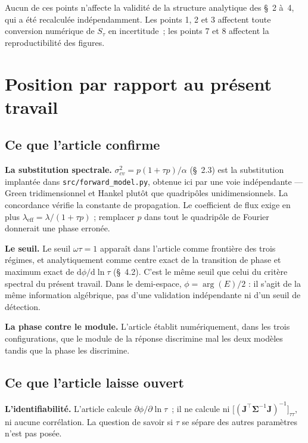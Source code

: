 \documentclass[11pt,a4paper]{article}
\newcommand{\code}[1]{\texttt{\small #1}}
\begin{document}
Aucun de ces points n'affecte la validité de la structure analytique des §~2 à~4, qui a été
recalculée indépendamment. Les points 1, 2 et 3 affectent toute conversion numérique de
$S_\tau$ en incertitude~; les points 7 et 8 affectent la reproductibilité des figures.

\section{Position par rapport au présent travail}

\subsection{Ce que l'article confirme}

\textbf{La substitution spectrale.} $\sigma_{cv}^2 = p(1+\tau p)/\alpha$ (§~2.3) est la
substitution implantée dans \code{src/\allowbreak forward\_model.py}, obtenue ici par une voie
indépendante --- Green tridimensionnel et Hankel plutôt que quadripôles unidimensionnels. La
concordance vérifie la constante de propagation. Le coefficient de flux exige
en plus $\lambda_{\mathrm{eff}}=\lambda/(1+\tau p)$ ; remplacer $p$ dans tout
le quadripôle de Fourier donnerait une phase erronée.

\textbf{Le seuil.} Le seuil $\omega\tau = 1$ apparaît dans l'article comme frontière des trois
régimes, et analytiquement comme centre exact de la transition de phase et maximum exact de
$\mathrm{d}\phi/\mathrm{d}\ln\tau$ (§~4.2). C'est le même seuil que celui du critère spectral du
présent travail. Dans le demi-espace, $\phi=\arg(E)/2$ : il s'agit de la même
information algébrique, pas d'une validation indépendante ni d'un seuil de détection.

\textbf{La phase contre le module.} L'article établit numériquement, dans les trois
configurations, que le module de la réponse discrimine mal les deux modèles tandis que la phase
les discrimine.

\subsection{Ce que l'article laisse ouvert}

\textbf{L'identifiabilité.} L'article calcule $\partial\phi/\partial\ln\tau$~; il ne calcule ni
$\big[(\mathbf J^{\!\top}\boldsymbol\Sigma^{-1}\mathbf J)^{-1}\big]_{\tau\tau}$, ni aucune
corrélation. La question de savoir si $\tau$ se sépare des autres paramètres n'est pas posée.
\end{document}
